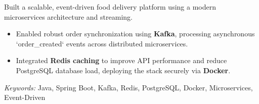 \noindent
{}

\noindent
Built a scalable, event-driven food delivery platform using a modern microservices architecture and streaming.

\begin{itemize}
    \item Enabled robust order synchronization using \textbf{Kafka}, processing asynchronous `order\_created` events across distributed microservices.
    \item Integrated \textbf{Redis caching} to improve API performance and reduce PostgreSQL database load, deploying the stack securely via \textbf{Docker}.
\end{itemize}

\noindent
\textit{Keywords:} Java, Spring Boot, Kafka, Redis, PostgreSQL, Docker, Microservices, Event-Driven

